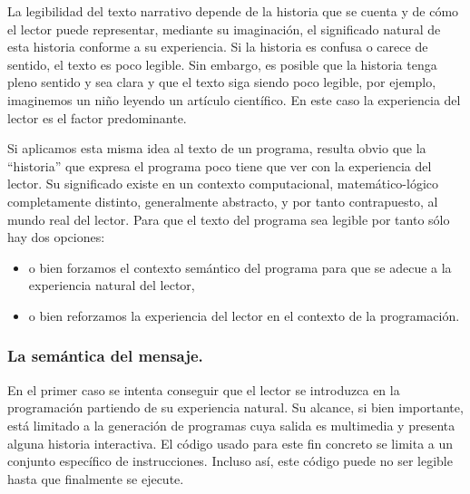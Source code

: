 \documentclass{llncs}
\begin{document}
La legibilidad del texto narrativo depende de la historia que se cuenta y de cómo el lector puede representar, mediante su imaginación, el significado natural de esta historia conforme a su experiencia. Si la historia es confusa o carece de sentido, el texto es poco legible. Sin embargo, es posible que la historia tenga pleno sentido y sea clara y que el texto siga siendo poco legible, por ejemplo, imaginemos un niño leyendo un artículo científico. En este caso la experiencia del lector es el factor predominante. 

Si aplicamos esta misma idea al texto de un programa, resulta obvio que la ``historia'' que expresa el programa poco tiene que ver con la experiencia del lector. Su significado existe en un contexto computacional, matemático-lógico completamente distinto, generalmente abstracto, y por tanto contrapuesto, al mundo real del lector. Para que el texto del programa sea legible por tanto sólo hay dos opciones: 

\begin{itemize}
\item o bien forzamos el contexto semántico del programa para que se adecue a la experiencia natural del lector, 
\item o bien reforzamos la experiencia del lector en el contexto de la programación. 
\end{itemize}

\subsubsection{La semántica del mensaje.}
\label{subsec:message}

En el primer caso se intenta conseguir que el lector se introduzca en la programación partiendo de su experiencia natural. Su alcance, si bien importante, está limitado a la generación de programas cuya salida es multimedia y presenta alguna historia interactiva. El código usado para este fin concreto se limita a un conjunto específico de instrucciones. Incluso así, este código puede no ser legible hasta que finalmente se ejecute. 
\end{document}
